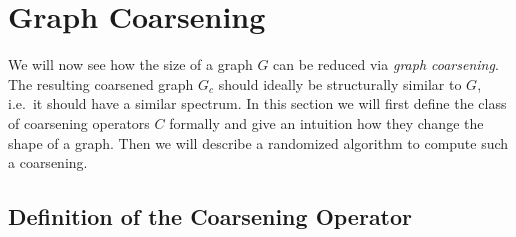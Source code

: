 \section{Graph Coarsening}%
\label{sec:coarse}

We will now see how the size of a graph $G$ can be reduced via \textit{graph coarsening}.
The resulting coarsened graph $G_c$ should ideally be structurally similar to $G$, i.e.\  it should have a similar spectrum.
In this section we will first define the class of coarsening operators $C$ formally and give an intuition how they change the shape of a graph.
Then we will describe a randomized algorithm to compute such a coarsening.

\subsection{Definition of the Coarsening Operator}%
\label{sec:coarse:formal}

